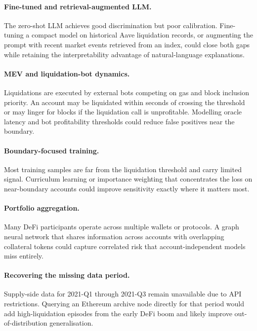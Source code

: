 \documentclass[12pt,a4paper]{article}
\begin{document}
\paragraph{Fine-tuned and retrieval-augmented LLM.}
The zero-shot LLM achieves good discrimination but poor calibration.
Fine-tuning a compact model on historical Aave liquidation records, or
augmenting the prompt with recent market events retrieved from an index,
could close both gaps while retaining the interpretability advantage of
natural-language explanations.

\paragraph{MEV and liquidation-bot dynamics.}
Liquidations are executed by external bots competing on gas and block
inclusion priority.  An account may be liquidated within seconds of
crossing the threshold or may linger for blocks if the liquidation call
is unprofitable.  Modelling oracle latency and bot profitability
thresholds could reduce false positives near the boundary.

\paragraph{Boundary-focused training.}
Most training samples are far from the liquidation threshold and carry
limited signal.  Curriculum learning or importance weighting that
concentrates the loss on near-boundary accounts could improve sensitivity
exactly where it matters most.

\paragraph{Portfolio aggregation.}
Many DeFi participants operate across multiple wallets or protocols.
A graph neural network that shares information across accounts with
overlapping collateral tokens could capture correlated risk that
account-independent models miss entirely.

\paragraph{Recovering the missing data period.}
Supply-side data for 2021-Q1 through 2021-Q3 remain unavailable due to
API restrictions.  Querying an Ethereum archive node directly for that
period would add high-liquidation episodes from the early DeFi boom and
likely improve out-of-distribution generalisation.
\end{document}
